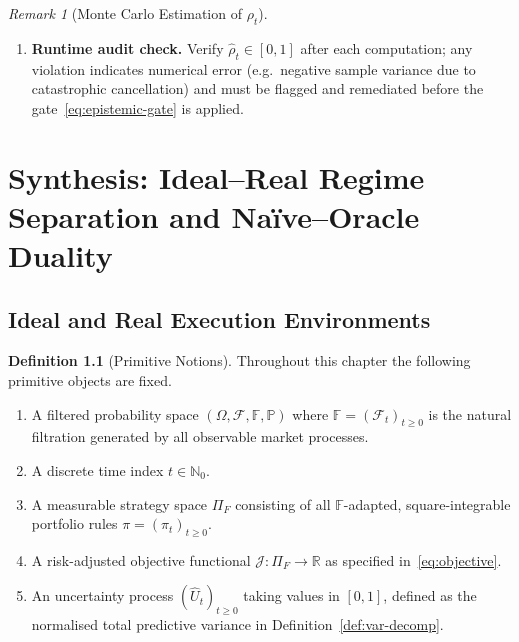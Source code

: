 \documentclass[12pt,openany]{book}
\numberwithin{equation}{chapter}
\theoremstyle{plain}
\theoremstyle{definition}
\newtheorem{definition}[theorem]{Definition}
\theoremstyle{remark}
\newtheorem{remark}[theorem]{Remark}
\numberwithin{equation}{chapter}
\theoremstyle{plain}
\begin{document}
\begin{remark}[Monte Carlo Estimation of $\rho_t$]
\begin{enumerate}
  \item \textbf{Runtime audit check.}
        Verify $\hat\rho_t \in [0, 1]$ after each computation; any
        violation indicates numerical error (e.g.\ negative sample
        variance due to catastrophic cancellation) and must be flagged
        and remediated before the gate~\eqref{eq:epistemic-gate} is
        applied.
\end{enumerate}
\end{remark}

\chapter{Synthesis: Ideal--Real Regime Separation and
  \texorpdfstring{}{} Na\"{i}ve--Oracle Duality}
\label{ch:synthesis}

\section{Ideal and Real Execution Environments}

\begin{definition}[Primitive Notions]
\label{def:primitives}
Throughout this chapter the following primitive objects are fixed.
\begin{enumerate}
  \item A filtered probability space
        $(\Omega,\mathcal{F},\mathbb{F},\mathbb{P})$ where
        $\mathbb{F}=(\mathcal{F}_t)_{t\geq 0}$ is the natural
        filtration generated by all observable market processes.
  \item A discrete time index $t \in \mathbb{N}_0$.
  \item A measurable strategy space $\Pi_F$ consisting of all
        $\mathbb{F}$-adapted, square-integrable portfolio rules
        $\pi = (\pi_t)_{t \geq 0}$.
  \item A risk-adjusted objective functional
        $\mathcal{J}:\Pi_F \to \mathbb{R}$ as specified
        in~\eqref{eq:objective}.
  \item An uncertainty process $(\hat{U}_t)_{t\geq 0}$ taking
        values in $[0,1]$, defined as the normalised total
        predictive variance in Definition~\ref{def:var-decomp}.
\end{enumerate}
\end{definition}
\end{document}
